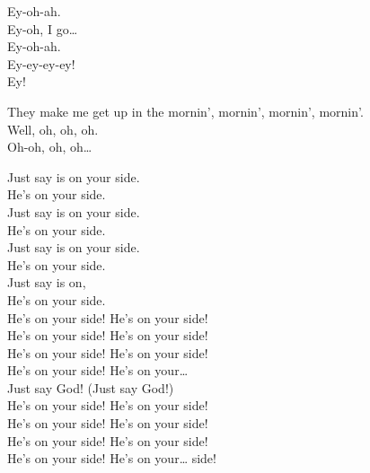 Ey-oh-ah. \\
Ey-oh, I go… \\

Ey-oh-ah. \\
Ey-ey-ey-ey! \\

Ey! \\




They make me get up in the mornin', mornin', mornin', mornin'. \\

Well, oh, oh, oh. \\
Oh-oh, oh, oh… \\




Just say  is on your side. \\
He's on your side. \\
Just say  is on your side. \\
He's on your side. \\
Just say  is on your side. \\
He's on your side. \\
Just say  is on, \\
He's on your side. \\

He's on your side! He's on your side! \\
He's on your side! He's on your side! \\
He's on your side! He's on your side! \\
He's on your side! He's on your… \\

Just say God! (Just say God!) \\

He's on your side! He's on your side! \\
He's on your side! He's on your side! \\
He's on your side! He's on your side! \\
He's on your side! He's on your… side! \\

